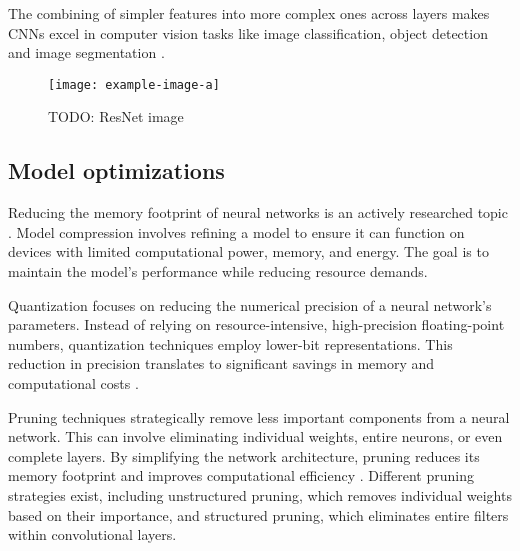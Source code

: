 The combining of simpler features into more complex ones across layers makes CNNs excel in computer vision tasks like image classification, object detection and image segmentation \cite{krizhevskyImageNetClassificationDeep2017}.





\begin{figure}[hbtp]
\centering    
\texttt{[image: example-image-a]}
\caption{TODO: ResNet image}
\end{figure}

\subsection{Model optimizations}
Reducing the memory footprint of neural networks is an actively researched topic \cite{neillOverviewNeuralNetwork2020, leEfficientNeuralNetworks2023}.
Model compression involves refining a model to ensure it can function on devices with limited computational power, memory, and energy.
The goal is to maintain the model's performance while reducing resource demands.

Quantization focuses on reducing the numerical precision of a neural network's parameters.
Instead of relying on resource-intensive, high-precision floating-point numbers, quantization techniques employ lower-bit representations.
This reduction in precision translates to significant savings in memory and computational costs \autocite{guoSurveyMethodsTheories2018}.

Pruning techniques strategically remove less important components from a neural network.
This can involve eliminating individual weights, entire neurons, or even complete layers.
By simplifying the network architecture, pruning reduces its memory footprint and improves computational efficiency \cite{blalockWhatStateNeural2020}.
Different pruning strategies exist, including unstructured pruning, which removes individual weights based on their importance, and structured pruning, which eliminates entire filters within convolutional layers.

